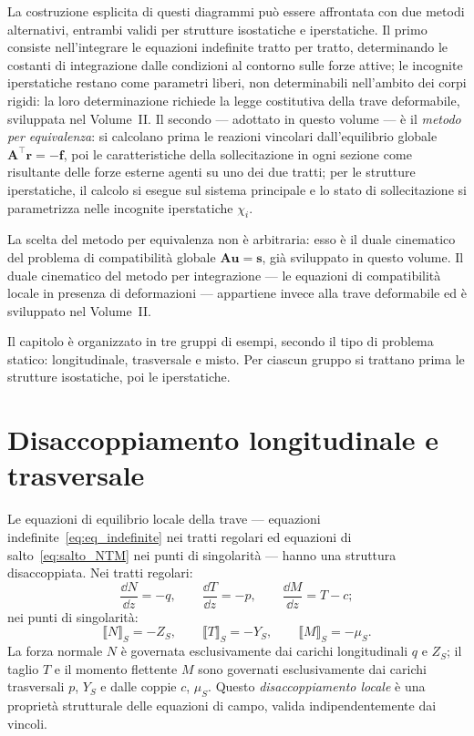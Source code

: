 La costruzione esplicita di questi diagrammi può
essere affrontata con due metodi alternativi,
entrambi validi per strutture isostatiche e
iperstatiche. Il primo consiste nell'integrare
le equazioni indefinite tratto per tratto,
determinando le costanti di integrazione dalle
condizioni al contorno sulle forze attive; le incognite iperstatiche restano come parametri
liberi, non determinabili nell'ambito dei corpi
rigidi: la loro determinazione richiede la legge
costitutiva della trave deformabile, sviluppata nel Volume~II.  Il secondo --- adottato in questo volume --- è il \emph{metodo per equivalenza}: si calcolano prima le reazioni vincolari dall'equilibrio globale $\bm{A}^\top \bm{r} =-\bm{f}$, poi le caratteristiche della
sollecitazione in ogni sezione come risultante delle forze esterne agenti su uno dei due tratti; per le strutture iperstatiche, il calcolo si
esegue sul sistema principale e lo stato di sollecitazione si parametrizza nelle incognite iperstatiche $\chi_i$.

La scelta del metodo per equivalenza non è
arbitraria: esso è il duale cinematico del
problema di compatibilità globale
$\bm{A}\bm{u} = \bm{s}$, già sviluppato in
questo volume. Il duale cinematico del metodo
per integrazione --- le equazioni di
compatibilità locale in presenza di deformazioni
--- appartiene invece alla trave deformabile ed
è sviluppato nel Volume~II.


Il capitolo è organizzato in tre gruppi di
esempi, secondo il tipo di problema statico:
longitudinale, trasversale e misto. Per ciascun
gruppo si trattano prima le strutture isostatiche,
poi le iperstatiche.


\section{Disaccoppiamento longitudinale e trasversale}
\label{sec:disaccoppiamento}

Le equazioni di equilibrio locale della trave ---
equazioni indefinite~\eqref{eq:eq_indefinite} nei
tratti regolari ed equazioni di
salto~\eqref{eq:salto_NTM} nei punti di singolarità
--- hanno una struttura disaccoppiata. Nei tratti
regolari:
\begin{equation}
	\frac{\dd N}{\dd z} = -q, \qquad
	\frac{\dd T}{\dd z} = -p, \qquad
	\frac{\dd M}{\dd z} = T - c;
\end{equation}
nei punti di singolarità:
\begin{equation}
	\llbracket N \rrbracket_S = -Z_S, \qquad
	\llbracket T \rrbracket_S = -Y_S, \qquad
	\llbracket M \rrbracket_S = -\mu_S.
\end{equation}
La forza normale $N$ è governata esclusivamente
dai carichi longitudinali $q$ e $Z_S$; il taglio
$T$ e il momento flettente $M$ sono governati
esclusivamente dai carichi trasversali $p$, $Y_S$
e dalle coppie $c$, $\mu_S$. Questo
\emph{disaccoppiamento locale} è una proprietà
strutturale delle equazioni di campo, valida
indipendentemente dai vincoli.

